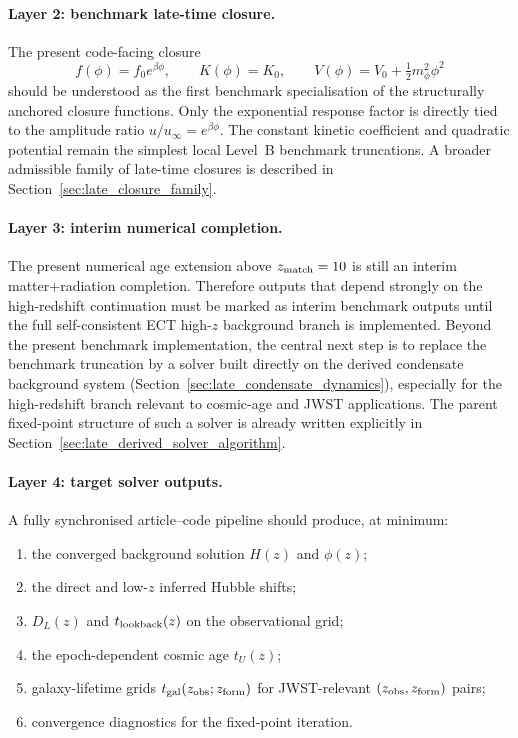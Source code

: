 \documentclass[11pt,a4paper]{article}
\numberwithin{equation}{section}
\begin{document}
\paragraph{Layer 2: benchmark late-time closure.}
The present code-facing closure
\[
f(\phi)=f_0 e^{\beta\phi},
\qquad
K(\phi)=K_0,
\qquad
V(\phi)=V_0+\tfrac12 m_\phi^2\phi^2
\]
should be understood as the first benchmark specialisation of the
structurally anchored closure functions.
Only the exponential response factor is directly tied to the amplitude
ratio $u/u_\infty=e^{\beta\phi}$.
The constant kinetic coefficient and quadratic potential remain the
simplest local Level~B benchmark truncations.
A broader admissible family of late-time closures is described in
Section~\ref{sec:late_closure_family}.

\paragraph{Layer 3: interim numerical completion.}
The present numerical age extension above $z_{\rm match}=10$ is still an
interim matter+radiation completion.
Therefore outputs that depend strongly on the high-redshift continuation
must be marked as interim benchmark outputs until the full
self-consistent ECT high-$z$ background branch is implemented.
Beyond the present benchmark implementation, the central next step is to
replace the benchmark truncation by a solver built directly on the
derived condensate background system
(Section~\ref{sec:late_condensate_dynamics}),
especially for the high-redshift branch relevant to cosmic-age and JWST applications.
The parent fixed-point structure of such a solver is already written
explicitly in Section~\ref{sec:late_derived_solver_algorithm}.

\paragraph{Layer 4: target solver outputs.}
A fully synchronised article--code pipeline should produce, at minimum:
\begin{enumerate}
  \item the converged background solution
  $H(z)$ and $\phi(z)$;
  \item the direct and low-$z$ inferred Hubble shifts;
  \item $D_L(z)$ and $t_{\rm lookback}(z)$ on the observational grid;
  \item the epoch-dependent cosmic age $t_U(z)$;
  \item galaxy-lifetime grids
  $t_{\rm gal}(z_{\rm obs};z_{\rm form})$
  for JWST-relevant $(z_{\rm obs},z_{\rm form})$ pairs;
  \item convergence diagnostics for the fixed-point iteration.
\end{enumerate}
\end{document}
